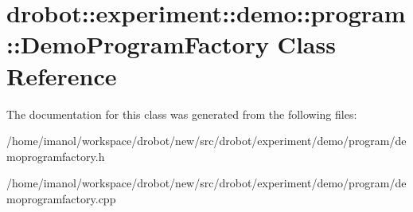 \hypertarget{classdrobot_1_1experiment_1_1demo_1_1program_1_1DemoProgramFactory}{\section{drobot\-:\-:experiment\-:\-:demo\-:\-:program\-:\-:Demo\-Program\-Factory Class Reference}
\label{classdrobot_1_1experiment_1_1demo_1_1program_1_1DemoProgramFactory}
}


The documentation for this class was generated from the following files\-:\begin{DoxyCompactItemize}
\item 
/home/imanol/workspace/drobot/new/src/drobot/experiment/demo/program/demoprogramfactory.\-h\item 
/home/imanol/workspace/drobot/new/src/drobot/experiment/demo/program/demoprogramfactory.\-cpp\end{DoxyCompactItemize}
